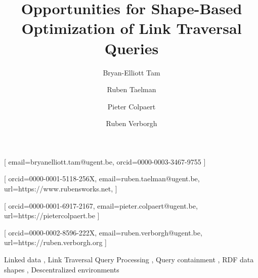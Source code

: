 \documentclass[
]{ceurart}
\begin{document}


\title{Opportunities for Shape-Based Optimization of Link Traversal Queries}


\author[1]{Bryan-Elliott Tam}[%
email=bryanelliott.tam@ugent.be,
orcid=0000-0003-3467-9755
]
\cormark[1]

\author[1]{Ruben Taelman}[%
orcid=0000-0001-5118-256X,
email=ruben.taelman@ugent.be,
url=https://www.rubensworks.net,
]
\author[1]{Pieter Colpaert}[%
orcid=0000-0001-6917-2167,
email=pieter.colpaert@ugent.be,
url=https://pietercolpaert.be
]
\author[1]{Ruben Verborgh}[%
orcid=0000-0002-8596-222X,
email=ruben.verborgh@ugent.be,
url=https://ruben.verborgh.org
]



\address[1]{IDLab,
Department of Electronics and Information Systems, Ghent University – imec}

\begin{keywords}
  Linked data \sep
  Link Traversal Query Processing \sep
  Query containment \sep
  RDF data shapes \sep
  Descentralized environments
\end{keywords}

\maketitle








\end{document}
